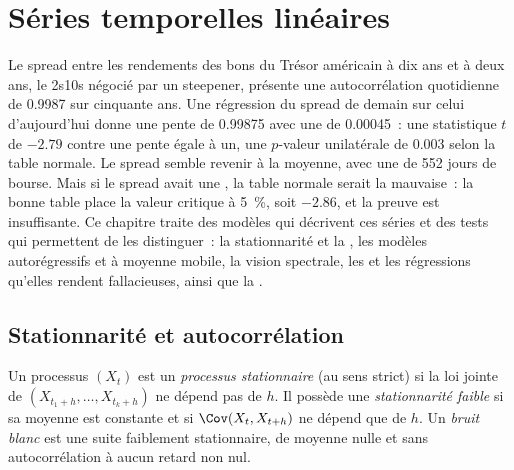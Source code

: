 \chapter{Séries temporelles linéaires}\label{ch:qm:linear-time-series}

Le spread entre les rendements des bons du Trésor américain à dix ans et à deux ans, le 2s10s négocié par un steepener, présente une autocorrélation quotidienne de
0.9987 sur cinquante ans. Une régression du spread de demain sur celui d'aujourd'hui donne une pente de 0.99875 avec une  de 0.00045~: une
statistique $t$ de $-2.79$ contre une pente égale à un, une $p$-valeur unilatérale de 0.003 selon la table normale. Le spread semble revenir à la moyenne,
avec une  de 552 jours de bourse. Mais si le spread avait une , la table normale serait la mauvaise~: la bonne table place la
valeur critique à 5~\%, soit $-2.86$, et la preuve est insuffisante. Ce chapitre traite des modèles qui décrivent ces séries et des tests qui
permettent de les distinguer~: la stationnarité et la , les modèles autorégressifs et à moyenne mobile, la vision spectrale, les 
et les régressions qu'elles rendent fallacieuses, ainsi que la .

\section{Stationnarité et autocorrélation}

\begin{definition}\label{def:qm:linear-time-series:stationary}
Un processus $(X_t)$ est un \emph{processus stationnaire} (au sens strict) si la loi jointe de $(X_{t_1 + h}, \dots, X_{t_k + h})$ ne
dépend pas de $h$. Il possède une \emph{stationnarité faible} si sa moyenne est constante et si $\Cov(X_t, X_{t+h})$ ne dépend que de $h$.
Un \emph{bruit blanc} est une suite faiblement stationnaire, de moyenne nulle et sans autocorrélation à aucun retard non nul.
\end{definition}

